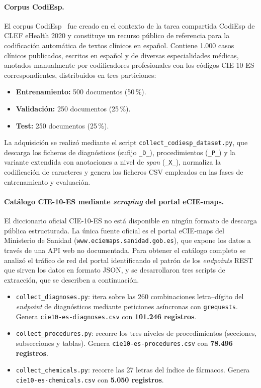 \paragraph{Corpus CodiEsp.}
El corpus CodiEsp~\cite{miranda2020} fue creado en el contexto de la tarea compartida CodiEsp de CLEF eHealth 2020 y constituye un recurso público de referencia para la codificación automática de textos clínicos en español. Contiene 1.000 casos clínicos publicados, escritos en español y de diversas especialidades médicas, anotados manualmente por codificadores profesionales con los códigos CIE-10-ES correspondientes, distribuidos en tres particiones:

\begin{itemize}
 \item \textbf{Entrenamiento:} 500 documentos (50\,\%).
 \item \textbf{Validación:} 250 documentos (25\,\%).
 \item \textbf{Test:} 250 documentos (25\,\%).
\end{itemize}

La adquisición se realizó mediante el script \texttt{collect\_codiesp\_dataset.py}, que descarga los ficheros de diagnósticos (sufijo \texttt{\_D\_}), procedimientos (\texttt{\_P\_}) y la variante extendida con anotaciones a nivel de \emph{span} (\texttt{\_X\_}), normaliza la codificación de caracteres y genera los ficheros CSV empleados en las fases de entrenamiento y evaluación.

\paragraph{Catálogo CIE-10-ES mediante \emph{scraping} del portal eCIE-maps.}
El diccionario oficial CIE-10-ES no está disponible en ningún formato de descarga pública estructurada. La única fuente oficial es el portal eCIE-maps del Ministerio de Sanidad (\texttt{www.eciemaps.sanidad.gob.es}), que expone los datos a través de una API web no documentada. Para obtener el catálogo completo se analizó el tráfico de red del portal identificando el patrón de los \emph{endpoints} REST que sirven los datos en formato JSON, y se desarrollaron tres scripts de extracción, que se describen a continuación.

\begin{itemize}
 \item \texttt{collect\_diagnoses.py}: itera sobre las 260 combinaciones letra–dígito del \emph{endpoint} de diagnósticos mediante peticiones asíncronas con \texttt{grequests}. Genera \texttt{cie10-es-diagnoses.csv} con \textbf{101.246 registros}.
 \item \texttt{collect\_procedures.py}: recorre los tres niveles de procedimientos (secciones, subsecciones y tablas). Genera \texttt{cie10-es-procedures.csv} con \textbf{78.496 registros}.
 \item \texttt{collect\_chemicals.py}: recorre las 27 letras del índice de fármacos. Genera \texttt{cie10-es-\allowbreak{}chemicals.csv} con \textbf{5.050 registros}.
\end{itemize}

